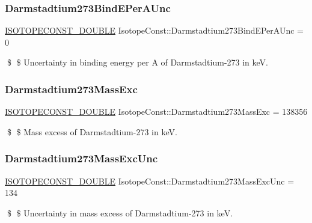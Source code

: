 \subsubsection{\texorpdfstring{Darmstadtium273\+Bind\+E\+Per\+A\+Unc}{Darmstadtium273BindEPerAUnc}}
{\footnotesize\ttfamily \mbox{\hyperlink{group___isotope_const-_macros_ga8f45a7272ce02c0b4c65c44636ed719a}{I\+S\+O\+T\+O\+P\+E\+C\+O\+N\+S\+T\+\_\+\+D\+O\+U\+B\+LE}} Isotope\+Const\+::\+Darmstadtium273\+Bind\+E\+Per\+A\+Unc = 0}

\$ \$ Uncertainty in binding energy per A of Darmstadtium-\/273 in keV. \mbox{\label{group___isotope_const-_darmstadtium-_ds273_ga33826e95b1862851453114c20cb74df9}} 
\subsubsection{\texorpdfstring{Darmstadtium273\+Mass\+Exc}{Darmstadtium273MassExc}}
{\footnotesize\ttfamily \mbox{\hyperlink{group___isotope_const-_macros_ga8f45a7272ce02c0b4c65c44636ed719a}{I\+S\+O\+T\+O\+P\+E\+C\+O\+N\+S\+T\+\_\+\+D\+O\+U\+B\+LE}} Isotope\+Const\+::\+Darmstadtium273\+Mass\+Exc = 138356}

\$ \$ Mass excess of Darmstadtium-\/273 in keV. \mbox{\label{group___isotope_const-_darmstadtium-_ds273_ga850c7d3c9cdd6567a598bb1996812603}} 
\subsubsection{\texorpdfstring{Darmstadtium273\+Mass\+Exc\+Unc}{Darmstadtium273MassExcUnc}}
{\footnotesize\ttfamily \mbox{\hyperlink{group___isotope_const-_macros_ga8f45a7272ce02c0b4c65c44636ed719a}{I\+S\+O\+T\+O\+P\+E\+C\+O\+N\+S\+T\+\_\+\+D\+O\+U\+B\+LE}} Isotope\+Const\+::\+Darmstadtium273\+Mass\+Exc\+Unc = 134}

\$ \$ Uncertainty in mass excess of Darmstadtium-\/273 in keV. \mbox{\label{group___isotope_const-_darmstadtium-_ds273_ga471047efd43b57a1aa60efdd88d96403}} 
